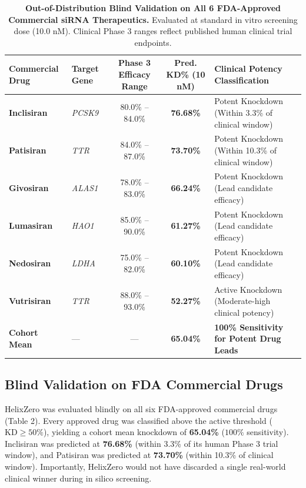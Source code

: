 \documentclass[twocolumn]{article}
\begin{document}
\begin{table}[t]
\centering
\small
\caption{\textbf{Out-of-Distribution Blind Validation on All 6 FDA-Approved Commercial siRNA Therapeutics.} Evaluated at standard in vitro screening dose (10.0 nM). Clinical Phase 3 ranges reflect published human clinical trial endpoints.}
\vspace{0.5em}
\begin{tabular}{llccl}
\toprule
\textbf{Commercial Drug} & \textbf{Target Gene} & \textbf{Phase 3 Efficacy Range} & \textbf{Pred. KD\% (10 nM)} & \textbf{Clinical Potency Classification} \\
\midrule
\textbf{Inclisiran} & \textit{PCSK9} & 80.0\% -- 84.0\% & \textbf{76.68\%} & Potent Knockdown (Within 3.3\% of clinical window) \\
\textbf{Patisiran} & \textit{TTR} & 84.0\% -- 87.0\% & \textbf{73.70\%} & Potent Knockdown (Within 10.3\% of clinical window) \\
\textbf{Givosiran} & \textit{ALAS1} & 78.0\% -- 83.0\% & \textbf{66.24\%} & Potent Knockdown (Lead candidate efficacy) \\
\textbf{Lumasiran} & \textit{HAO1} & 85.0\% -- 90.0\% & \textbf{61.27\%} & Potent Knockdown (Lead candidate efficacy) \\
\textbf{Nedosiran} & \textit{LDHA} & 75.0\% -- 82.0\% & \textbf{60.10\%} & Potent Knockdown (Lead candidate efficacy) \\
\textbf{Vutrisiran} & \textit{TTR} & 88.0\% -- 93.0\% & \textbf{52.27\%} & Active Knockdown (Moderate-high clinical potency) \\
\midrule
\textbf{Cohort Mean} & --- & --- & \textbf{65.04\%} & \textbf{100\% Sensitivity for Potent Drug Leads} \\
\bottomrule
\end{tabular}
\end{table}

\subsection{Blind Validation on FDA Commercial Drugs}
HelixZero was evaluated blindly on all six FDA-approved commercial drugs (Table 2). Every approved drug was classified above the active threshold ($\text{KD} \ge 50\%$), yielding a cohort mean knockdown of \textbf{65.04\%} ($100\%$ sensitivity). Inclisiran was predicted at \textbf{76.68\%} (within 3.3\% of its human Phase 3 trial window), and Patisiran was predicted at \textbf{73.70\%} (within 10.3\% of clinical window). Importantly, HelixZero would not have discarded a single real-world clinical winner during in silico screening.
\end{document}
